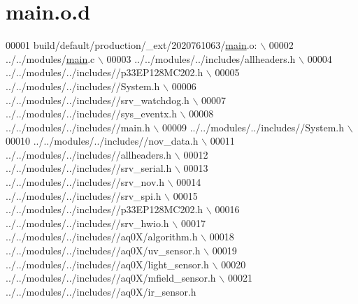 \hypertarget{a00049_source}{\section{main.\+o.\+d}
\label{a00049_source}
}

\begin{DoxyCode}
00001 build/\textcolor{keywordflow}{default}/production/\_ext/2020761063/\hyperlink{a00048_a840291bc02cba5474a4cb46a9b9566fe}{main}.o:  \(\backslash\)
00002 ../../modules/\hyperlink{a00048_a840291bc02cba5474a4cb46a9b9566fe}{main}.c  \(\backslash\)
00003 ../../modules/../includes/allheaders.h  \(\backslash\)
00004 ../../modules/../includes\textcolor{comment}{//p33EP128MC202.h  \(\backslash\)}
00005 \textcolor{comment}{../../modules/../includes//System.h  \(\backslash\)}
00006 \textcolor{comment}{../../modules/../includes//srv\_watchdog.h  \(\backslash\)}
00007 \textcolor{comment}{../../modules/../includes//sys\_eventx.h  \(\backslash\)}
00008 \textcolor{comment}{../../modules/../includes//main.h  \(\backslash\)}
00009 \textcolor{comment}{../../modules/../includes//System.h  \(\backslash\)}
00010 \textcolor{comment}{../../modules/../includes//nov\_data.h  \(\backslash\)}
00011 \textcolor{comment}{../../modules/../includes//allheaders.h  \(\backslash\)}
00012 \textcolor{comment}{../../modules/../includes//srv\_serial.h  \(\backslash\)}
00013 \textcolor{comment}{../../modules/../includes//srv\_nov.h  \(\backslash\)}
00014 \textcolor{comment}{../../modules/../includes//srv\_spi.h  \(\backslash\)}
00015 \textcolor{comment}{../../modules/../includes//p33EP128MC202.h  \(\backslash\)}
00016 \textcolor{comment}{../../modules/../includes//srv\_hwio.h  \(\backslash\)}
00017 \textcolor{comment}{../../modules/../includes//aq0X/algorithm.h  \(\backslash\)}
00018 \textcolor{comment}{../../modules/../includes//aq0X/uv\_sensor.h  \(\backslash\)}
00019 \textcolor{comment}{../../modules/../includes//aq0X/light\_sensor.h  \(\backslash\)}
00020 \textcolor{comment}{../../modules/../includes//aq0X/mfield\_sensor.h  \(\backslash\)}
00021 \textcolor{comment}{../../modules/../includes//aq0X/ir\_sensor.h }
\end{DoxyCode}
